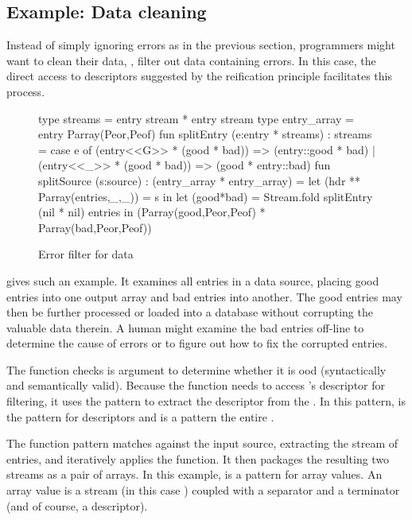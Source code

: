 \subsection{Example: Data cleaning}
Instead of simply ignoring errors as in the previous section,
programmers might want to clean their data, \ie{}, filter out data containing errors. In this case, the direct access to descriptors suggested by the reification principle facilitates this process.

\begin{figure}
\begin{code}
type streams = entry stream * entry stream
type entry\_array = entry Parray(Peor,Peof)
\mbox{}
fun splitEntry (e:entry * streams) : streams =
  case e of
    (entry<<G>> * (good * bad)) => (entry::good * bad)
  | (entry<<_>> * (good * bad)) => (good * entry::bad)
\mbox{}
fun splitSource (s:source) : (entry\_array * entry\_array) =
    let (hdr ** Parray(entries,_,_)) = s in
    let (good*bad) = Stream.fold splitEntry (nil * nil) entries in
    (Parray(good,Peor,Peof) * Parray(bad,Peor,Peof))     
\end{code}
\caption{Error filter for \dibbler{} data}
\label{fig:ex-data-clean}
\end{figure}

 gives such an example. 
It examines all entries in a \dibbler{} data source, placing good entries into one output array and bad entries into another.
The good entries
may then be further processed or loaded into a database
without corrupting the valuable data therein.  A human might examine
the bad entries off-line to determine the cause of errors or to
figure out how to fix the corrupted entries.

The  function checks is argument  to
determine whether it is ood (syntactically and semantically
valid).  Because the function needs to access 's descriptor for filtering,
it uses the   pattern to extract the descriptor from the \pvalue{}.  In this pattern,   is the pattern for descriptors and  is a pattern the entire \pvalue{}.

The  function pattern matches against the input
source, extracting the stream of entries, and iteratively applies the
 function.  It then packages the resulting two streams as a pair of arrays. In this example, 
is a pattern for array values.  An array value is a stream (in this
case ) coupled with a separator and a terminator (and of course, a descriptor).  


